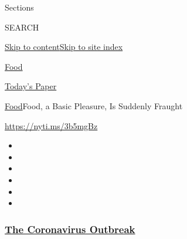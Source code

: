 Sections

SEARCH

\protect\hyperlink{site-content}{Skip to
content}\protect\hyperlink{site-index}{Skip to site index}

\href{https://www.nytimes3xbfgragh.onion/section/food}{Food}

\href{https://myaccount.nytimes3xbfgragh.onion/auth/login?response_type=cookie\&client_id=vi}{}

\href{https://www.nytimes3xbfgragh.onion/section/todayspaper}{Today's
Paper}

\href{/section/food}{Food}\textbar{}Food, a Basic Pleasure, Is Suddenly
Fraught

\url{https://nyti.ms/3b5mgBz}

\begin{itemize}
\item
\item
\item
\item
\item
\item
\end{itemize}

\hypertarget{the-coronavirus-outbreak}{%
\subsubsection{\texorpdfstring{\href{https://www.nytimes3xbfgragh.onion/news-event/coronavirus?name=styln-coronavirus-national\&region=TOP_BANNER\&variant=undefined\&block=storyline_menu_recirc\&action=click\&pgtype=Article\&impression_id=58e38ea0-e392-11ea-982c-75d1fa15f353}{The
Coronavirus
Outbreak}}{The Coronavirus Outbreak}}\label{the-coronavirus-outbreak}}

